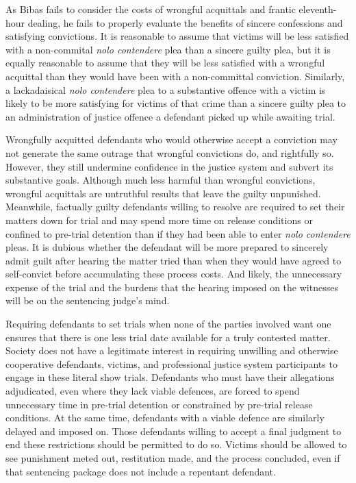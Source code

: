 As Bibas fails to consider the costs of wrongful acquittals and frantic eleventh-hour dealing, he fails to properly evaluate the benefits of sincere confessions and satisfying convictions. It is reasonable to assume that victims will be less satisfied with a non-commital \textit{nolo contendere} plea than a sincere guilty plea, but it is equally reasonable to assume that they will be less satisfied with a wrongful acquittal than they would have been with a non-committal conviction. Similarly, a lackadaisical \textit{nolo contendere} plea to a substantive offence with a victim is likely to be more satisfying for victims of that crime than a sincere guilty plea to an administration of justice offence a defendant picked up while awaiting trial. 

Wrongfully acquitted defendants who would otherwise accept a conviction may not generate the same outrage that wrongful convictions do, and rightfully so. However, they still undermine confidence in the justice system and subvert its substantive goals. Although much less harmful than wrongful convictions, wrongful acquittals are untruthful results that leave the guilty unpunished. Meanwhile, factually guilty defendants willing to resolve are required to set their matters down for trial and may spend more time on release conditions or confined to pre-trial detention than if they had been able to enter \textit{nolo contendere} pleas. It is dubious whether the defendant will be more prepared to sincerely admit guilt after hearing the matter tried than when they would have agreed to self-convict before accumulating these process costs. And likely, the unnecessary expense of the trial and the burdens that the hearing imposed on the witnesses will be on the sentencing judge's mind.

Requiring defendants to set trials when none of the parties involved want one ensures that there is one less trial date available for a truly contested matter. Society does not have a legitimate interest in requiring unwilling and otherwise cooperative defendants, victims, and professional justice system participants to engage in these literal show trials. Defendants who must have their allegations adjudicated, even where they lack viable defences, are forced to spend unnecessary time in pre-trial detention or constrained by pre-trial release conditions. At the same time, defendants with a viable defence are similarly delayed and imposed on. Those defendants willing to accept a final judgment to end these restrictions should be permitted to do so. Victims should be allowed to see punishment meted out, restitution made, and the process concluded, even if that sentencing package does not include a repentant defendant. 
